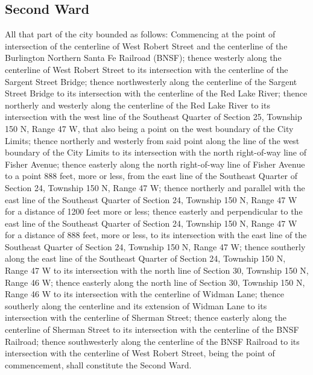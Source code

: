 \documentclass[code.tex]{subfiles}
\begin{document}
\subsection{Second Ward}
All that part of the city bounded as follows:  Commencing at the point of intersection of the centerline of West Robert Street and the centerline of the Burlington Northern Santa Fe Railroad (BNSF); thence westerly along the centerline of West Robert Street to its intersection with the centerline of the Sargent Street Bridge; thence northwesterly along the centerline of the Sargent Street Bridge to its intersection with the centerline of the Red Lake River; thence northerly and westerly along the centerline of the Red Lake River to its intersection with the west line of the Southeast Quarter of Section 25, Township 150 N, Range 47 W, that also being a point on the west boundary of the City Limits; thence northerly and westerly from said point along the line of the west boundary of the City Limits to its intersection with the north right-of-way line of Fisher Avenue; thence easterly along the north right-of-way line of Fisher Avenue to a point 888 feet, more or less, from the east line of the Southeast Quarter of Section 24, Township 150 N, Range 47 W; thence northerly and parallel with the east line of the Southeast Quarter of Section 24, Township 150 N, Range 47 W for a distance of 1200 feet more or less; thence easterly and perpendicular to the east line of the Southeast Quarter of Section 24, Township 150 N, Range 47 W for a distance of 888 feet, more or less, to its intersection with the east line of the Southeast Quarter of Section 24, Township 150 N, Range 47 W; thence southerly along the east line of the Southeast Quarter of Section 24, Township 150 N, Range 47 W to its intersection with the north line of Section 30, Township 150 N, Range 46 W; thence easterly along the north line of Section 30, Township 150 N, Range 46 W to its intersection with the centerline of Widman Lane; thence southerly along the centerline and its extension of Widman Lane to its intersection with the centerline of Sherman Street; thence easterly along the centerline of Sherman Street to its intersection with the centerline of the BNSF Railroad; thence southwesterly along the centerline of the BNSF Railroad to its intersection with the centerline of West Robert Street, being the point of commencement, shall constitute the Second Ward.
\end{document}
